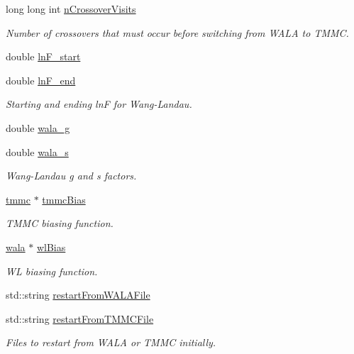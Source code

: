 \begin{DoxyCompactItemize}
long long int \hyperlink{classsim_system_aa748f651ddd9a2bf6d88bfcab9153905}{n\-Crossover\-Visits}
\begin{DoxyCompactList}\small\item\em Number of crossovers that must occur before switching from W\-A\-L\-A to T\-M\-M\-C. \end{DoxyCompactList}\item 
double \hyperlink{classsim_system_a794334e163fbeb4b4f61bcea676679ce}{ln\-F\-\_\-start}
\item 
double \hyperlink{classsim_system_a3fb5d01fd3abf49f577c050968fba9d1}{ln\-F\-\_\-end}
\begin{DoxyCompactList}\small\item\em Starting and ending ln\-F for Wang-\/\-Landau. \end{DoxyCompactList}\item 
double \hyperlink{classsim_system_aa2e866e69ebe5fa0761894212592175a}{wala\-\_\-g}
\item 
double \hyperlink{classsim_system_a7cc3431bb59acca9165b044dbd07dcdc}{wala\-\_\-s}
\begin{DoxyCompactList}\small\item\em Wang-\/\-Landau g and s factors. \end{DoxyCompactList}\item 
\hyperlink{classtmmc}{tmmc} $\ast$ \hyperlink{classsim_system_a13173f45a1e40a5f5a3552b0ebe15b54}{tmmc\-Bias}
\begin{DoxyCompactList}\small\item\em T\-M\-M\-C biasing function. \end{DoxyCompactList}\item 
\hyperlink{classwala}{wala} $\ast$ \hyperlink{classsim_system_a6dc8d9f89dfcfa247a59bc50889c49e7}{wl\-Bias}
\begin{DoxyCompactList}\small\item\em W\-L biasing function. \end{DoxyCompactList}\item 
std\-::string \hyperlink{classsim_system_afbf0b172dc35572e71ec6d27a018e2fc}{restart\-From\-W\-A\-L\-A\-File}
\item 
std\-::string \hyperlink{classsim_system_a5ccdad82b3767ba21b1e4b1e36362082}{restart\-From\-T\-M\-M\-C\-File}
\begin{DoxyCompactList}\small\item\em Files to restart from W\-A\-L\-A or T\-M\-M\-C initially. \end{DoxyCompactList}\item 

\end{DoxyCompactItemize}
